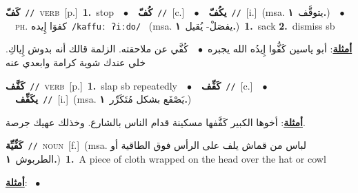 \documentclass[10pt,a4paper,twoside]{article} %
\begin{document}
\begin{multicols}{2}
{\setlength\topsep{0pt}\textbf{\foreignlanguage{arabic}{كَفّ}}\ {\color{gray}\texttt{//}\color{black}}\ \textsc{verb}\ [p.]\ \textbf{1.}~stop\ \ $\bullet$\ \ \setlength\topsep{0pt}\textbf{\foreignlanguage{arabic}{كُفّ}}\ {\color{gray}\texttt{//}\color{black}}\ [c.]\ \ $\bullet$\ \ \setlength\topsep{0pt}\textbf{\foreignlanguage{arabic}{يكُفّ}}\ {\color{gray}\texttt{//}\color{black}}\ [i.]\ \color{gray}(msa. \foreignlanguage{arabic}{يتوقَّف}~\foreignlanguage{arabic}{\textbf{١.}})\color{black}\ \ $\bullet$\ \ \textsc{ph.} \color{gray} \foreignlanguage{arabic}{كفوَا إِيده}\color{black}\ {\color{gray}\texttt{/{\sffamily kaffuː ʔiːdo}/}\color{black}}\ \color{gray} (msa. \foreignlanguage{arabic}{يفصَلْ- يُقيل}~\foreignlanguage{arabic}{\textbf{١.}})\color{black}\ \textbf{1.}~sack  \textbf{2.}~dismiss sb\  \begin{flushright}\color{gray}\foreignlanguage{arabic}{\textbf{\underline{\foreignlanguage{arabic}{أمثلة}}}: أبو ياسين كَفُّوا إِيدُه الله يجبره\ $\bullet$\ \  كُفَّي عن ملاحقته. الزلمة قالك أنه بدوش إِياكِ. خلي عندك شوية كرامة وابعدي عنه}\end{flushright}\color{black}} \vspace{2mm}

{\setlength\topsep{0pt}\textbf{\foreignlanguage{arabic}{كَفَّف}}\ {\color{gray}\texttt{//}\color{black}}\ \textsc{verb}\ [p.]\ \textbf{1.}~slap sb repeatedly\ \ $\bullet$\ \ \setlength\topsep{0pt}\textbf{\foreignlanguage{arabic}{كَفِّف}}\ {\color{gray}\texttt{//}\color{black}}\ [c.]\ \ $\bullet$\ \ \setlength\topsep{0pt}\textbf{\foreignlanguage{arabic}{يكَفِّف}}\ {\color{gray}\texttt{//}\color{black}}\ [i.]\ \color{gray}(msa. \foreignlanguage{arabic}{يَصْفَع بشكل مُتَكَرِّر}~\foreignlanguage{arabic}{\textbf{١.}})\color{black}\  \begin{flushright}\color{gray}\foreignlanguage{arabic}{\textbf{\underline{\foreignlanguage{arabic}{أمثلة}}}: أخوها الكبير كَفَّفها مسكينة قدام الناس بالشارع. وخذلك عهيك جرصة.}\end{flushright}\color{black}} \vspace{2mm}

{\setlength\topsep{0pt}\textbf{\foreignlanguage{arabic}{كَفِّيِّة}}\ {\color{gray}\texttt{//}\color{black}}\ \textsc{noun}\ [f.]\ \color{gray}(msa. \foreignlanguage{arabic}{لباس من قماش يلف على الرأس فوق الطاقية أو الطربوش}~\foreignlanguage{arabic}{\textbf{١.}})\color{black}\ \textbf{1.}~A piece of cloth wrapped on the head over the hat or cowl\  \begin{flushright}\color{gray}\foreignlanguage{arabic}{\textbf{\underline{\foreignlanguage{arabic}{أمثلة}}}: \ $\bullet$\ \  }\end{flushright}\color{black}} \vspace{2mm}


\end{multicols}
\end{document}

